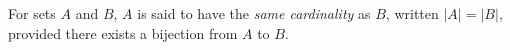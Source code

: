 \guard



\begin{defn}
\label{defn:sameCardinality}
  For sets $A$ and $B$, $A$ is said to have the \emph{same cardinality} as $B$, written $\vert A\vert = \vert B\vert$, provided there exists a bijection from $A$ to $B$.
\end{defn}

